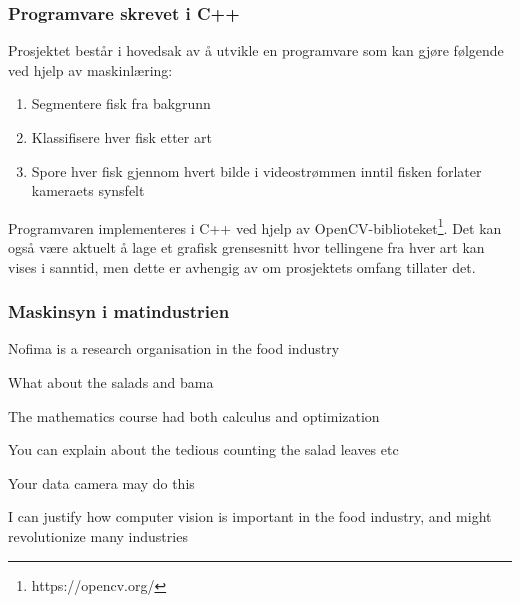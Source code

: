 \subsubsection{Programvare skrevet i C++}

Prosjektet består i hovedsak av å utvikle en programvare som kan gjøre følgende ved hjelp av maskinlæring: 

\begin{enumerate}
\item Segmentere fisk fra bakgrunn
\item Klassifisere hver fisk etter art
\item Spore hver fisk gjennom hvert bilde i videostrømmen inntil fisken forlater kameraets synsfelt
\end{enumerate}

Programvaren implementeres i C++ ved hjelp av OpenCV-biblioteket\footnote{https://opencv.org/}. Det kan også være aktuelt å lage et grafisk grensesnitt hvor tellingene fra hver art kan vises i sanntid, men dette er avhengig av om prosjektets omfang tillater det. 



\subsubsection{Maskinsyn i matindustrien}

Nofima is a research organisation in the food industry

What about the salads and bama

The mathematics course had both calculus and optimization

You can explain about the tedious counting the salad leaves etc

Your data camera may do this

I can justify how computer vision is important in the food industry, and might revolutionize many industries

